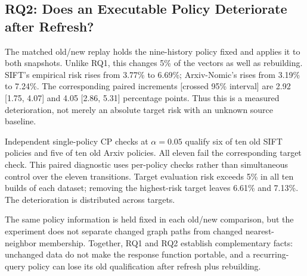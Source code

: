 \subsection{RQ2: Does an Executable Policy Deteriorate after Refresh?}
The matched old/new replay holds the nine-history policy fixed and applies it to both snapshots. Unlike RQ1, this changes 5\% of the vectors as well as rebuilding. SIFT's empirical risk rises from 3.77\% to 6.69\%; Arxiv-Nomic's rises from 3.19\% to 7.24\%. The corresponding paired increments [crossed 95\% interval] are 2.92 [1.75, 4.07] and 4.05 [2.86, 5.31] percentage points. Thus this is a measured deterioration, not merely an absolute target risk with an unknown source baseline.

Independent single-policy CP checks at $\alpha=0.05$ qualify six of ten old SIFT policies and five of ten old Arxiv policies. All eleven fail the corresponding target check. This paired diagnostic uses per-policy checks rather than simultaneous control over the eleven transitions. Target evaluation risk exceeds 5\% in all ten builds of each dataset; removing the highest-risk target leaves 6.61\% and 7.13\%. The deterioration is distributed across targets.

The same policy information is held fixed in each old/new comparison, but the experiment does not separate changed graph paths from changed nearest-neighbor membership. Together, RQ1 and RQ2 establish complementary facts: unchanged data do not make the response function portable, and a recurring-query policy can lose its old qualification after refresh plus rebuilding.
